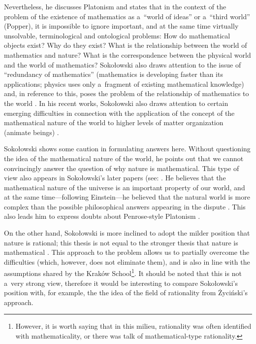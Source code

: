 \documentclass[%
  manuscript=article,
  year=2024,
  volume=77,
  doi=00000.000,
]{zfn}
\begin{document}
Nevertheless, he discusses Platonism and states that in the context of the problem of the existence of mathematics as a~``world of ideas'' or a~``third world'' (Popper), it is impossible to ignore important, and at the same time virtually unsolvable, terminological and ontological problems: How do mathematical objects exist? Why do they exist? What is the relationship between the world of mathematics and nature? What is the correspondence between the physical world and the world of mathematics? Sokołowski also draws attention to the issue of ``redundancy of mathematics'' (mathematics is developing faster than its applications; physics uses only a~fragment of existing mathematical knowledge) and, in reference to this, poses the problem of the relationship of mathematics to the world 
\parencite[][pp.217–220]{Sokoowski2011Pare}. %
 In his recent works, Sokołowski also draws attention to certain emerging difficulties in connection with the application of the concept of the mathematical nature of the world to higher levels of matter organization (animate beings)
\parencite[][p.74]{Sokoowski2015Co}.%




Sokołowski shows some caution in formulating answers here. Without questioning the idea of the mathematical nature of the world, he points out that we cannot convincingly answer the question of why nature is mathematical. This type of view also appears in Sokołowski's later papers (see: 
\parencite[][p.65]{Sokoowski2015Co}. %
 He believes that the mathematical nature of the universe is an important property of our world, and at the same time---following Einstein---he believed that the natural world is more complex than the possible philosophical answers appearing in the dispute 
\parencites[][pp.190–191]{Sokoowski1987Alberta}[][p.67]{Sokoowski2015Co}. %
 This also leads him to express doubts about Penrose-style Platonism 
\parencite[][p.218]{Sokoowski2011Pare}.%




On the other hand, Sokołowski is more inclined to adopt the milder position that nature is rational; this thesis is not equal to the stronger thesis that nature is mathematical 
\parencite[][p.215]{Sokoowski2001Wspoczesne}. %
 This approach to the problem allows us to partially overcome the difficulties (which, however, does not eliminate them), and is also in line with the assumptions shared by the Kraków School\footnote{However, it is worth saying that in this milieu, rationality was often identified with mathematicality, or there was talk of mathematical-type rationality.}. It should be noted that this is not a~very strong view, therefore it would be interesting to compare Sokołowski's position with, for example, the the idea of the field of rationality from Życiński's approach.
\end{document}
